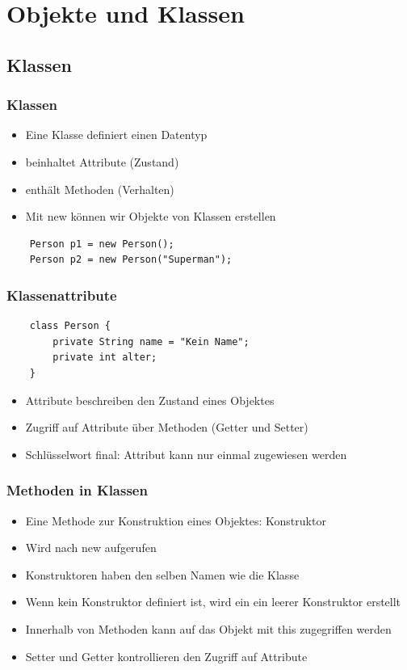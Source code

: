 \section{Objekte und Klassen}

\subsection{Klassen}
\begin{frame}[fragile]
\frametitle{Klassen}
\begin{itemize}
    \item Eine Klasse definiert einen Datentyp
    \item beinhaltet Attribute (Zustand)
    \item enthält Methoden (Verhalten)
    \item Mit new können wir Objekte von Klassen erstellen
\end{itemize}
\begin{lstlisting}
    Person p1 = new Person();
    Person p2 = new Person("Superman");
\end{lstlisting}
\end{frame}

\begin{frame}[fragile]
\frametitle{Klassenattribute}
\begin{lstlisting}
    class Person {
        private String name = "Kein Name";
        private int alter;
    }
\end{lstlisting}
\begin{itemize}
    \item Attribute beschreiben den Zustand eines Objektes
    \item Zugriff auf Attribute über Methoden (Getter und Setter)
    \item Schlüsselwort final: Attribut kann nur einmal zugewiesen werden
\end{itemize}
\end{frame}

\begin{frame}[fragile]
\frametitle{Methoden in Klassen}
\begin{itemize}
    \item Eine Methode zur Konstruktion eines Objektes: Konstruktor
    \item Wird nach new aufgerufen
    \item Konstruktoren haben den selben Namen wie die Klasse
    \item Wenn kein Konstruktor definiert ist, wird ein ein leerer Konstruktor erstellt
    \item Innerhalb von Methoden kann auf das Objekt mit this zugegriffen werden
    \item Setter und Getter kontrollieren den Zugriff auf Attribute
\end{itemize}
\end{frame}

